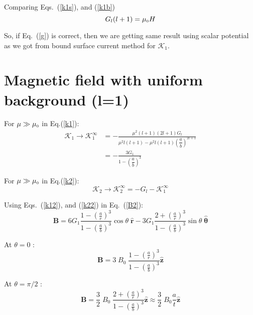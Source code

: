 Comparing Eqs.~(\ref{k1s}), and (\ref{k1b})
\begin{equation}\label{g}
G_l(l+1)=\mu_{\scriptscriptstyle 0} H
\end{equation}

So, if Eq.~(\ref{g}) is correct, then we are getting same result using scalar potential as we got from bound surface current method for $\mathcal{K}_1$.

\section{Magnetic field with uniform background (l=1)}

For \(\mu\gg\mu_{\scriptscriptstyle 0}\) in Eq.(\ref{k1}):
\begin{equation}\label{k12}
\begin{split}
\mathcal{K}_1\rightarrow\mathcal{K}_1^\infty & =-\frac{\mu^2(l+1) (2l+1)G_l}{\mu^2 l(l+1)-\mu^2 l(l+1)\left(\dfrac{a}{b}\right)^{2l+1}}\\
& =-\frac{3 G_1}{1-\left(\dfrac{a}{b}\right)^{3}}
\end{split}
\end{equation}

For \(\mu\gg\mu_{\scriptscriptstyle 0}\) in Eq.(\ref{k2}):
\begin{equation}\label{k22}
\mathcal{K}_2\rightarrow\mathcal{K}_2^\infty=-G_l-\mathcal{K}_1^\infty
\end{equation}

Using Eqs.~(\ref{k12}), and (\ref{k22}) in Eq.~(\ref{B2}):
\begin{equation}
    \bm{B}=6 G_1\frac{1-\left(\frac{a}{r}\right)^3}{1-\left(\frac{a}{b}\right)^3}\cos\theta\;\bm{\hat{r}}-3 G_1\frac{2+\left(\frac{a}{r}\right)^3}{1-\left(\frac{a}{b}\right)^3}\sin\theta\;\bm{\hat{\theta}}
\end{equation}

At $\theta=0$ :
\begin{equation}
    \bm{B}=3\;B_0\;\frac{1-\left(\frac{a}{r}\right)^3}{1-\left(\frac{a}{b}\right)^3}\bm{\hat{z}}
\end{equation}

At $\theta=\pi/2$ :
\begin{equation}
    \bm{B}=\frac{3}{2}\;B_0\;\frac{2+\left(\frac{a}{r}\right)^3}{1-\left(\frac{a}{b}\right)^3}\bm{\hat{z}}\approx \frac{3}{2}\;B_0\frac{a}{t}\bm{\hat{z}}
\end{equation}

